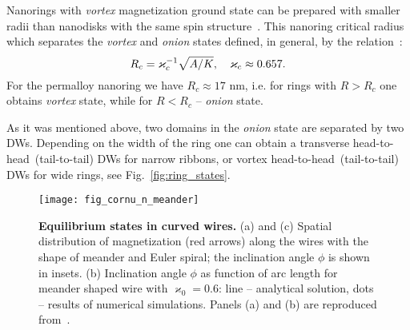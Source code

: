 Nanorings with \textit{vortex} magnetization ground state can be prepared with smaller radii than nanodisks with the same spin structure~\cite{Kravchuk07}. This nanoring critical radius which separates the \textit{vortex} and \textit{onion} states defined, in general, by the relation~\cite{Sheka15}:
\begin{equation}\notag
R_{c} = \varkappa_c^{-1}\sqrt{A/K},\quad \varkappa_c \approx 0.657.
\end{equation}
For the permalloy nanoring we have $R_{c}\approx 17$ nm, i.e. for rings with $R>R_c$ one obtains \textit{vortex} state, while for $R<R_c$ -- \textit{onion} state.

As it was mentioned above, two domains in the \textit{onion} state are separated by two DWs. Depending on the width of the ring one can obtain a transverse head-to-head~(tail-to-tail) DWs for narrow ribbons, or vortex head-to-head~(tail-to-tail) DWs for wide rings, see Fig.~\ref{fig:ring_states}.

\begin{figure}[t]
	\texttt{[image: fig\_cornu\_n\_meander]}
	\caption{\label{fig:cornu_n_meander}%
		\textbf{Equilibrium states in curved wires.} (a) and (c) Spatial distribution of magnetization (red arrows) along the wires with the shape of meander and Euler spiral; the inclination angle $\phi$ is shown in insets. (b) Inclination angle $\phi$ as function of arc length for meander shaped wire with $\varkappa_0=0.6$: line -- analytical solution, dots -- results of numerical simulations. Panels (a) and (b) are reproduced from~\cite{Korniienko19b}.}
\end{figure}

